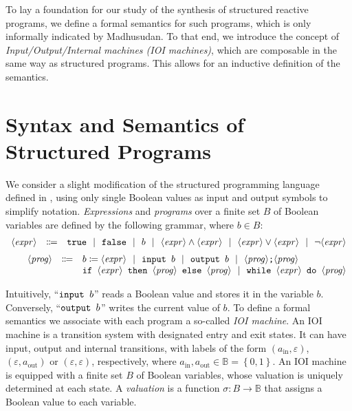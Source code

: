 \documentclass[submission,copyright,creativecommons]{eptcs}
\newcommand{\ignore}[1]{}
\newcommand{\z}[1]{\text{#1}}
\newcommand{\set}[1]{\left\{ #1 \right\}}
\newcommand{\pcode}[1]{\textup{\tt{#1}}}\newcommand{\tup}[1]{\overline{#1}}
\begin{document}
To lay a foundation for our study of the synthesis of structured reactive
programs, we define a formal semantics for such programs, which is only
informally indicated by Madhusudan.
To that end, we introduce the concept of
\emph{Input/Output/Internal machines (IOI machines)},
which are composable in the same way as structured programs.
This allows for an inductive definition of the semantics.
\ignore{TODO: Point to technical report?}

\vspace{5mm}
\section{Syntax and Semantics of Structured Programs}

We consider a slight modification of the structured
programming language defined in \cite{madhusudan:LIPIcs:2011:3247},
using only single Boolean values as input and output symbols to simplify
notation.
\emph{Expressions} and \emph{programs} over a finite set $B$ of
Boolean variables
are defined by the following grammar, where $b \in B$:
\vspace{6pt}
\newcommand{\tbar}{\enspace\,|\,\enspace}\newcommand{\ph}[1]{\langle\mathit{#1}\rangle}
\begin{align*}
	\begin{array}{ccl}
		\ph{expr} & \Coloneqq & \pcode{true} \tbar \pcode{false} \tbar b \tbar
								\ph{expr}\land\ph{expr} \tbar \ph{expr}\lor\ph{expr} \tbar \neg\ph{expr}
	\end{array}
	\\[2pt]
	\begin{array}{ccl}
		\ph{prog} & \Coloneqq & b \coloneqq \ph{expr} \tbar \pcode{input }b \tbar \pcode{output }b \tbar
								\ph{prog}\pcode{;}\ph{prog} \\
				&			&	\pcode{if } \ph{expr} \pcode{ then } \ph{prog} \pcode{ else } \ph{prog} \tbar
								\pcode{while } \ph{expr} \pcode{ do } \ph{prog}
	\end{array}
\end{align*}

Intuitively, ``$\pcode{input } b$'' reads a Boolean value and
stores it in the variable $b$.
Conversely, ``$\pcode{output } b$'' writes the current value of $b$.
To define a formal semantics we associate
with each program a so-called
\emph{IOI machine}.
An IOI machine is a transition system with designated entry and exit
states.
It can have input, output and internal
transitions, with labels of the form $(a_\z{in},\varepsilon)$,
$(\varepsilon,a_\z{out})$ or $(\varepsilon,\varepsilon)$, respectively,
where $a_\z{in}, a_\z{out} \in \mathbb{B}=\set{0,1}$.
An IOI machine is equipped with a finite set $B$ of Boolean variables,
whose valuation is uniquely determined at each state.
A \emph{valuation}
is a function $\sigma\colon B \to \mathbb{B}$ that assigns a Boolean value
to each variable.
\end{document}
